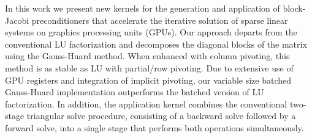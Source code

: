 In this work we present new kernels for the generation and application of block-Jacobi preconditioners that accelerate the
iterative solution of sparse linear systems on graphics processing units (GPUs).
Our approach departs from the conventional LU factorization and decomposes the diagonal blocks of the matrix
using the Gauss-Huard method.
When enhanced with column pivoting, this method is as stable as LU with partial/row pivoting.
Due to extensive use of GPU registers and integration of implicit pivoting,
our variable size batched Gauss-Huard implementation outperforms the batched version of LU factorization.
In addition, 
the application kernel combines the conventional two-stage triangular solve procedure, consisting of a backward solve followed by
a forward solve, into a single stage that performs both operations simultaneously.
